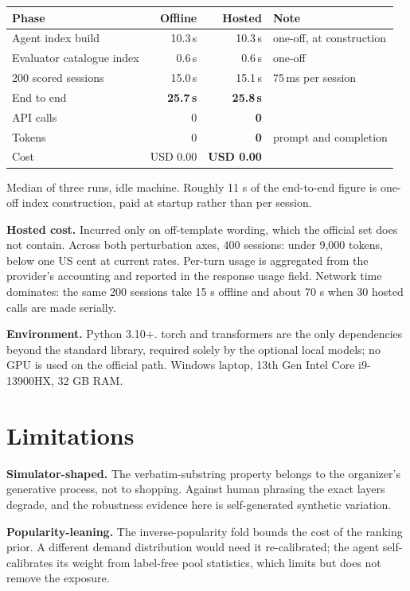 \documentclass[11pt,a4paper]{article}
\begin{document}
\begin{center}\small\begin{tabular}{@{}lrrl@{}}\toprule
\textbf{Phase} & \textbf{Offline} & \textbf{Hosted} & \textbf{Note} \\ \midrule
Agent index build & 10.3\,s & 10.3\,s & one-off, at construction \\
Evaluator catalogue index & 0.6\,s & 0.6\,s & one-off \\
200 scored sessions & 15.0\,s & 15.1\,s & 75\,ms per session \\
\midrule
End to end & \textbf{25.7\,s} & \textbf{25.8\,s} & \\
API calls & 0 & \textbf{0} & \\
Tokens & 0 & \textbf{0} & prompt and completion \\
Cost & USD 0.00 & \textbf{USD 0.00} & \\
\bottomrule\end{tabular}\end{center}
Median of three runs, idle machine. Roughly 11 s of the end-to-end figure is one-off index construction, paid at startup rather than per session.

\textbf{Hosted cost.} Incurred only on off-template wording, which the official set does not contain. Across both perturbation axes, 400 sessions: under 9,000 tokens, below one US cent at current rates. Per-turn usage is aggregated from the provider's accounting and reported in the response usage field. Network time dominates: the same 200 sessions take 15 s offline and about 70 s when 30 hosted calls are made serially.

\textbf{Environment.} Python 3.10+. torch and transformers are the only dependencies beyond the standard library, required solely by the optional local models; no GPU is used on the official path. Windows laptop, 13th Gen Intel Core i9-13900HX, 32 GB RAM.

\section{Limitations}
\textbf{Simulator-shaped.} The verbatim-substring property belongs to the organizer's generative process, not to shopping. Against human phrasing the exact layers degrade, and the robustness evidence here is self-generated synthetic variation.

\textbf{Popularity-leaning.} The inverse-popularity fold bounds the cost of the ranking prior. A different demand distribution would need it re-calibrated; the agent self-calibrates its weight from label-free pool statistics, which limits but does not remove the exposure.
\end{document}
